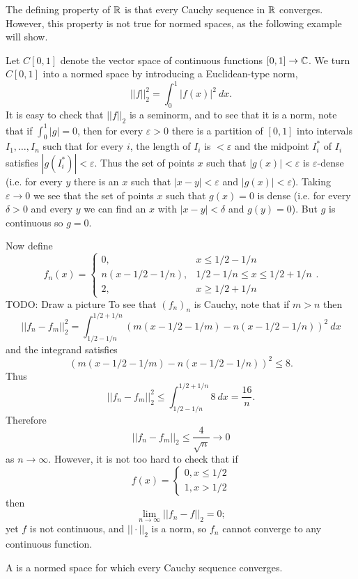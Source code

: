 The defining property of $\mathbb{R}$ is that every Cauchy sequence in $\mathbb{R}$ converges.
However, this property is not true for normed spaces, as the following example will show.
\begin{example}
Let $C[0, 1]$ denote the vector space of continuous functions $[0, 1] \to \mathbb{C}$.
We turn $C[0, 1]$ into a normed space by introducing a Euclidean-type norm,
$$||f||_2^2 = \int_0^1 |f(x)|^2 ~dx.$$
It is easy to check that $||f||_2$ is a seminorm, and to see that it is a norm, note that if $\int_0^1 |g| = 0$, then for every $\varepsilon > 0$ there is a partition of $[0, 1]$ into intervals $I_1, \dots, I_n$ such that for every $i$, the length of $I_i$ is $<\varepsilon$ and the midpoint $I_i^*$ of $I_i$ satisfies $|g(I_i^*)| < \varepsilon$.
Thus the set of points $x$ such that $|g(x)| < \varepsilon$ is $\varepsilon$-dense (i.e. for every $y$ there is an $x$ such that $|x - y| < \varepsilon$ and $|g(x)| < \varepsilon$).
Taking $\varepsilon \to 0$ we see that the set of points $x$ such that $g(x) = 0$ is dense (i.e. for every $\delta > 0$ and every $y$ we can find an $x$ with $|x - y| < \delta$ and $g(y) = 0$).
But $g$ is continuous so $g = 0$.

Now define
$$f_n(x) = \begin{cases}
0, &x \leq 1/2 - 1/n\\
n(x - 1/2 - 1/n), &1/2 - 1/n \leq x \leq 1/2 + 1/n\\
2, &x \geq 1/2 + 1/n
\end{cases}.$$
TODO: Draw a picture
To see that $(f_n)_n$ is Cauchy, note that if $m > n$ then
$$||f_n - f_m||_2^2 = \int_{1/2-1/n}^{1/2+1/n} (m(x - 1/2 - 1/m) - n(x - 1/2 - 1/n))^2~dx$$
and the integrand satisfies
$$(m(x - 1/2 - 1/m) - n(x - 1/2 - 1/n))^2 \leq 8.$$
Thus
$$||f_n - f_m||_2^2 \leq \int_{1/2-1/n}^{1/2+1/n} 8~dx = \frac{16}{n}.$$
Therefore
$$||f_n - f_m||_2 \leq \frac{4}{\sqrt n} \to 0$$
as $n \to \infty$. However, it is not too hard to check that if
$$f(x) = \begin{cases}
0, x \leq 1/2\\
1, x > 1/2
\end{cases}$$
then
$$\lim_{n \to \infty} ||f_n - f||_2 = 0;$$
yet $f$ is not continuous, and $||\cdot||_2$ is a norm, so $f_n$ cannot converge to any continuous function.
\end{example}

\begin{definition}
A  is a normed space for which every Cauchy sequence converges.
\end{definition}

